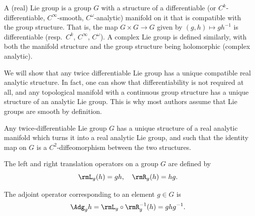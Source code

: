 \begin{defn}
    A (real) Lie group is a group $G$ with a structure of a differentiable (or $C^k$-differentiable, $C^\infty$-smooth, $C^\omega$-analytic) manifold on it that is compatible with the group structure. That is, the map $G\times G\to G$ given by $(g,h)\mapsto gh^{-1}$ is differentiable (resp.~$C^k$, $C^\infty$, $C^\omega$). A complex Lie group is defined similarly, with both the manifold structure and the group structure being holomorphic (complex analytic).
\end{defn}

We will show that any twice differentiable Lie group has a unique compatible real analytic structure. In fact, one can show that differentiability is not required at all, and any topological manifold with a continuous group structure has a unique structure of an analytic Lie group. This is why most authors assume that Lie groups are smooth by definition.

\begin{prop}[{{\cite[Thm.~1.6.3]{DK}}}]
    Any twice-differentiable Lie group $G$ has a unique structure of a real analytic manifold which turns it into a real analytic Lie group, and such that the identity map on $G$ is a $C^2$-diffeomorphism between the two structures.
\end{prop}


\begin{defn}
    The left and right translation operators on a group $G$ are defined by
    \[\rmL_g(h)=gh,\quad \rmR_g(h)=hg.\]
    
    The adjoint operator corresponding to an element $g\in G$ is
    \[\Adg_g h=\rmL_g\circ \rmR_g^{-1}(h)=ghg^{-1}.\]
\end{defn}


